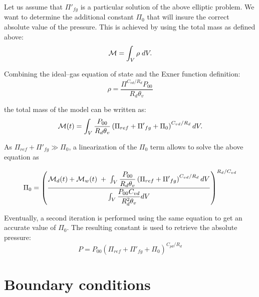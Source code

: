 Let us assume that ${\Pi '}_{fg}$ is a particular solution of the above elliptic
problem. We want to determine the additional constant $\Pi_0$ that will insure the correct
absolute value of the pressure.  This is achieved by using the total mass as defined above:
\begin{equation}
{\cal M} = \int _{V} \rho \;  dV.
\end{equation}

Combining the ideal--gas equation of state and the Exner function definition:
\begin{equation}
\rho =
\dfrac{\Pi^{C_{vd}/R_d}P_{00} }{R_d \theta_{v}} \label{DURstate}
\end{equation}

the total mass of the model can be written as:
\begin{equation}
{\cal M}(t)  =
  \int _{V}  \dfrac{P_{00} }{R_d \theta_{v}}
  \left( \Pi_{ref} + {\Pi '}_{fg} + \Pi_0 \right)^{C_{vd}/R_d} dV.
\end{equation}

As $\Pi_{ref} + {\Pi '}_{fg} \gg \Pi_0$, a linearization of the $\Pi_0$
term allows to solve the above equation as

\begin{equation}
\Pi_{0}   = \left(
  \dfrac{ {\cal M}_{d}(t) + {\cal M}_{w}(t)
 \; +  \; \int _{V}  \dfrac{P_{00} }{R_d \theta_{v}}
  \left( \Pi_{ref} + {\Pi '}_{fg} \right)^{C_{vd}/R_d} dV }
{ \int _{V}  \dfrac{P_{00} C_{vd}} {R_d^2 \theta_{v}} dV }
                                  \right)^{R_d/C_{vd}}
\end{equation}

Eventually, a second iteration is performed using the same equation to get
an accurate value of $\Pi_0$.
The resulting constant is used to retrieve the absolute pressure:
\begin{equation}
P= P_{00} \left( \Pi_{ref} + {\Pi '}_{fg} + \Pi_0 \right)^{C_{pd}/R_d}
\end{equation}

\section{Boundary conditions}

